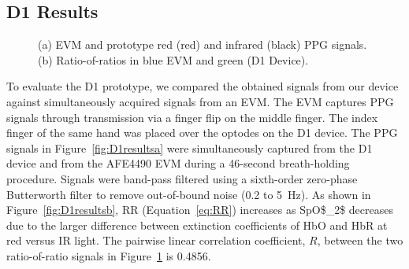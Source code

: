 \subsection{D1 Results}
\begin{figure}
    \begin{center}
    \end{center}
    \caption{(a) EVM and prototype red (red) and infrared (black) \ac{PPG} signals. (b) Ratio-of-ratios in blue EVM and green (D1 Device).} 
    \label{fig:D1results}
\end{figure}
To evaluate the D1 prototype, we compared the obtained signals from our device against simultaneously acquired signals from an \ac{EVM}. The \ac{EVM} captures \ac{PPG} signals through transmission via a finger flip on the middle finger. The index finger of the same hand was placed over the optodes on the D1 device. The \ac{PPG} signals in Figure~\ref{fig:D1resultsa} were simultaneously captured from the D1 device and from the \ac{AFE4490} \ac{EVM} during a 46-second breath-holding procedure. Signals were band-pass filtered using a sixth-order zero-phase Butterworth filter to remove out-of-bound noise (0.2 to 5~Hz). As shown in Figure~\ref{fig:D1resultsb}, \ac{RR} (Equation~\ref{eq:RR}) increases as \ac{SpO$_2$} decreases due to the larger difference between extinction coefficients of \ac{HbO} and \ac{HbR} at red versus \ac{IR} light. The pairwise linear correlation coefficient, $R$, between the two ratio-of-ratio signals in Figure~\ref{fig:D1results} is 0.4856. 



